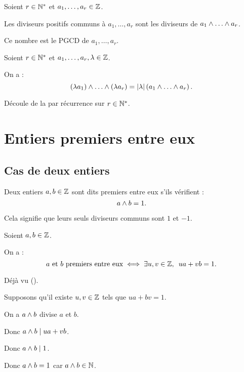 \begin{defprop}
Soient \(r\in\mathbb{N}^*\) et \(a_1,\dots,a_r\in\mathbb{Z}\).

Les diviseurs positifs communs à \(a_1,\dots,a_r\) sont les diviseurs de \(a_1\et\dots\et a_r\).

Ce nombre est le PGCD de \(a_1,\dots,a_r\).
\end{defprop}

\begin{prop}
Soient \(r\in\mathbb{N}^*\) et \(a_1,\dots,a_r,\lambda\in\mathbb{Z}\).

On a : \[\paren{\lambda a_1}\et\dots\et\paren{\lambda a_r}=\abs{\lambda}\paren{a_1\et\dots\et a_r}.\]
\end{prop}

\begin{dem}
Découle de la  par récurrence sur \(r\in\mathbb{N}^*\).
\end{dem}

\section{Entiers premiers entre eux}\label{sec:entiersPremiersEntreEux}

\subsection{Cas de deux entiers}

\begin{defi}
Deux entiers \(a,b\in\mathbb{Z}\) sont dits premiers entre eux s'ils vérifient : \[a\land b=1.\]

Cela signifie que leurs seuls diviseurs communs sont \(1\) et \(-1\).
\end{defi}

\begin{theo}
Soient \(a,b\in\mathbb{Z}\).

On a : \[a\text{ et }b\text{ premiers entre eux}\ssi\quantifs{\exists u,v\in\Z}ua+vb=1.\]
\end{theo}

\begin{dem}
\impdir Déjà vu (\cf {}).

\imprec

Supposons qu'il existe \(u,v\in\mathbb{Z}\) tels que \(ua+bv=1\).

On a \(a\land b\) divise \(a\) et \(b\).

Donc \(a\land b\mid ua+vb\).

Donc \(a\land b\mid1\).

Donc \(a\land b=1\) car \(a\land b\in\mathbb{N}\).
\end{dem}

